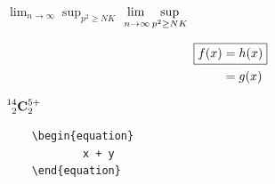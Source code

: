 \documentclass[12pt]{article}
\begin{document}
\vspace{1cm}

$\lim_{n\to\infty} \sup_{p^2\geq NK}$
\qquad
$\adjustlimits\lim_{n\to\infty} \sup_{p^2\geq NK}$

\vspace{1cm}

\begin{align*}
	\Aboxed{f(x) &= h(x)}\\
				 & = g(x)
\end{align*}

\vspace{1cm}

$\prescript{14}{2}{\mathbf{C}}^{5+}_{2}$

\vspace{1cm}

\begin{verbatim}
	\begin{equation}
			x + y
	\end{equation}
\end{verbatim}
\end{document}
